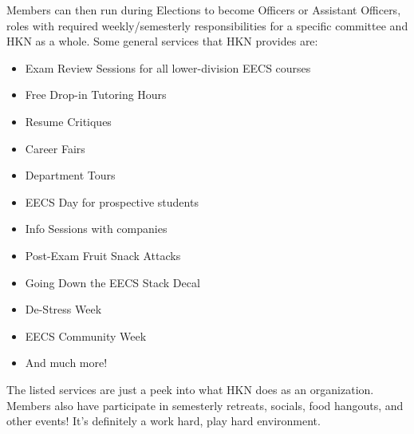 \documentclass[11pt, article, oneside]{memoir}
\begin{document}
        \bigbreak

        Members can then run during Elections to become Officers or Assistant Officers, roles with required weekly/semesterly responsibilities for a specific committee and HKN as a whole. Some general services that HKN provides are:
            \begin{itemize}
                \item Exam Review Sessions for all lower-division EECS courses
                \item Free Drop-in Tutoring Hours
                \item Resume Critiques
                \item Career Fairs
                \item Department Tours
                \item EECS Day for prospective students
                \item Info Sessions with companies
                \item Post-Exam Fruit Snack Attacks
                \item Going Down the EECS Stack Decal
                \item De-Stress Week
                \item EECS Community Week 
                \item And much more!
            \end{itemize}
        
        The listed services are just a peek into what HKN does as an organization. Members also have participate in semesterly retreats, socials, food hangouts, and other events! It's definitely a work hard, play hard environment. 

\end{document}
